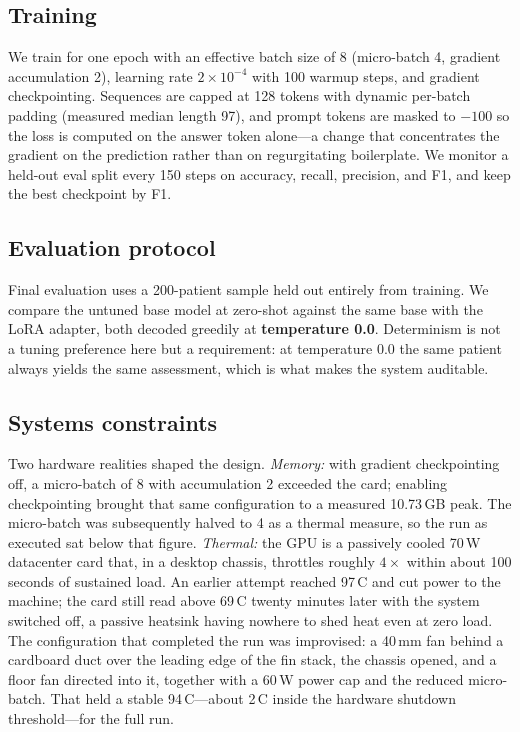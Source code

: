 \documentclass[sigconf,nonacm]{acmart}
\begin{document}
\subsection{Training}
We train for one epoch with an effective batch size of 8 (micro-batch 4,
gradient accumulation 2), learning rate $2\times10^{-4}$ with 100 warmup steps,
and gradient checkpointing. Sequences are capped at 128 tokens with dynamic
per-batch padding (measured median length 97), and prompt tokens are masked to
$-100$ so the loss is computed on the answer token alone---a change that
concentrates the gradient on the prediction rather than on regurgitating
boilerplate. We monitor a held-out eval split every 150 steps on
accuracy, recall, precision, and F1, and keep the best checkpoint by F1.

\subsection{Evaluation protocol}
Final evaluation uses a 200-patient sample held out entirely from training. We
compare the untuned base model at zero-shot against the same base with the LoRA
adapter, both decoded greedily at \textbf{temperature 0.0}. Determinism is not a
tuning preference here but a requirement: at temperature 0.0 the same patient
always yields the same assessment, which is what makes the system auditable.

\subsection{Systems constraints}
Two hardware realities shaped the design. \emph{Memory:} with gradient
checkpointing off, a micro-batch of 8 with accumulation 2 exceeded the card;
enabling checkpointing brought that same configuration to a measured 10.73\,GB
peak. The micro-batch was subsequently halved to 4 as a thermal measure, so the
run as executed sat below that figure. \emph{Thermal:} the GPU is a passively
cooled 70\,W datacenter card that, in a desktop chassis, throttles roughly
$4\times$ within about 100 seconds of sustained load. An earlier attempt reached
97\,\textdegree C and cut power to the machine; the card still read above
69\,\textdegree C twenty minutes later with the system switched off, a passive
heatsink having nowhere to shed heat even at zero load. The configuration that
completed the run was improvised: a 40\,mm fan behind a cardboard duct over the
leading edge of the fin stack, the chassis opened, and a floor fan directed into
it, together with a 60\,W power cap and the reduced micro-batch. That held a
stable 94\,\textdegree C---about 2\,\textdegree C inside the hardware shutdown
threshold---for the full run.
\end{document}
